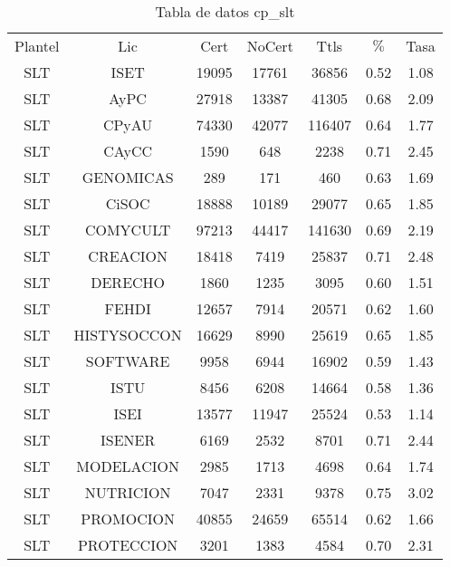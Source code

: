 \documentclass[12pt]{article}
\begin{document}
\begin{table}[h]
\centering
\begin{tabular}{ccccccc}

Plantel & Lic & Cert & NoCert & Ttls & $\%$ & Tasa \\

SLT & ISET & 19095 & 17761 & 36856 & 0.52 & 1.08 \\
SLT & AyPC & 27918 & 13387 & 41305 & 0.68 & 2.09 \\
SLT & CPyAU & 74330 & 42077 & 116407 & 0.64 & 1.77 \\
SLT & CAyCC & 1590 & 648 & 2238 & 0.71 & 2.45 \\
SLT & GENOMICAS & 289 & 171 & 460 & 0.63 & 1.69 \\
SLT & CiSOC & 18888 & 10189 & 29077 & 0.65 & 1.85 \\
SLT & COMYCULT & 97213 & 44417 & 141630 & 0.69 & 2.19 \\
SLT & CREACION & 18418 & 7419 & 25837 & 0.71 & 2.48 \\
SLT & DERECHO & 1860 & 1235 & 3095 & 0.60 & 1.51 \\
SLT & FEHDI & 12657 & 7914 & 20571 & 0.62 & 1.60 \\
SLT & HISTYSOCCON & 16629 & 8990 & 25619 & 0.65 & 1.85 \\
SLT & SOFTWARE & 9958 & 6944 & 16902 & 0.59 & 1.43 \\
SLT & ISTU & 8456 & 6208 & 14664 & 0.58 & 1.36 \\
SLT & ISEI & 13577 & 11947 & 25524 & 0.53 & 1.14 \\
SLT & ISENER & 6169 & 2532 & 8701 & 0.71 & 2.44 \\
SLT & MODELACION & 2985 & 1713 & 4698 & 0.64 & 1.74 \\
SLT & NUTRICION & 7047 & 2331 & 9378 & 0.75 & 3.02 \\
SLT & PROMOCION & 40855 & 24659 & 65514 & 0.62 & 1.66 \\
SLT & PROTECCION & 3201 & 1383 & 4584 & 0.70 & 2.31 \\

\end{tabular}
\caption{Tabla de datos cp\_slt}
\end{table}
\end{document}
